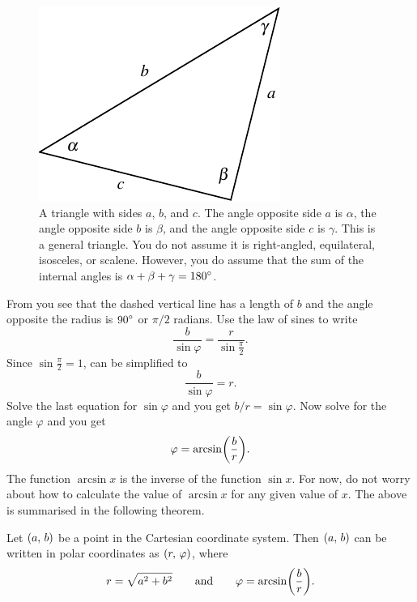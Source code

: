 \documentclass[a4paper,oneside,12pt]{article}
\begin{document}
\begin{figure}[!htbp]
\centering
\includegraphics[scale=1.1]{image/04/law-sines.pdf}
\caption{%
  A triangle with sides $a$, $b$, and $c$.  The angle opposite side
  $a$ is $\alpha$, the angle opposite side $b$ is $\beta$, and the
  angle opposite side $c$ is $\gamma$.  This is a general triangle.
  You do not assume it is right-angled, equilateral, isosceles, or
  scalene.  However, you do assume that the sum of the internal angles
  is $\alpha + \beta + \gamma = {180}^{\circ}$.
}
\label{fig:law_of_sines}
\end{figure}

From
 you see that
the dashed vertical line has a length of $b$ and the angle opposite
the radius is ${90}^{\circ}$ or $\pi / 2$ radians.  Use the law of
sines to write
\begin{equation}
\label{eqn:law_of_sines}
\frac{b}{\sin \varphi}
=
\frac{r}{\sin \frac{\pi}{2}}.
\end{equation}
Since $\sin \frac{\pi}{2} = 1$,  can be
simplified to
\[
\frac{b}{\sin \varphi}
=
r.
\]
Solve the last equation for $\sin \varphi$ and you get
$b/r = \sin \varphi$.  Now solve for the angle $\varphi$ and you get
\[
\varphi
=
\arcsin\parenthesis*{\frac{b}{r}}.
\]
The function $\arcsin x$ is the inverse of the function $\sin x$.  For
now, do not worry about how to calculate the value of $\arcsin x$ for
any given value of $x$.  The above is summarised in the following
theorem.

\begin{theorem}
\label{thm:convert_Cartesian_to_polar_coordinates}
Let $\left\lparen{a},\, {b}\right\rparen$ be a point in the Cartesian coordinate system.
Then $\left\lparen{a},\, {b}\right\rparen$ can be written in polar coordinates as
$\left\lparen{r},\, {\varphi}\right\rparen$, where
\[
r
=
\sqrt{a^2 + b^2}
\qquad
\text{and}
\qquad
\varphi
=
\arcsin\parenthesis*{\frac{b}{r}}.
\]
\end{theorem}
\end{document}
